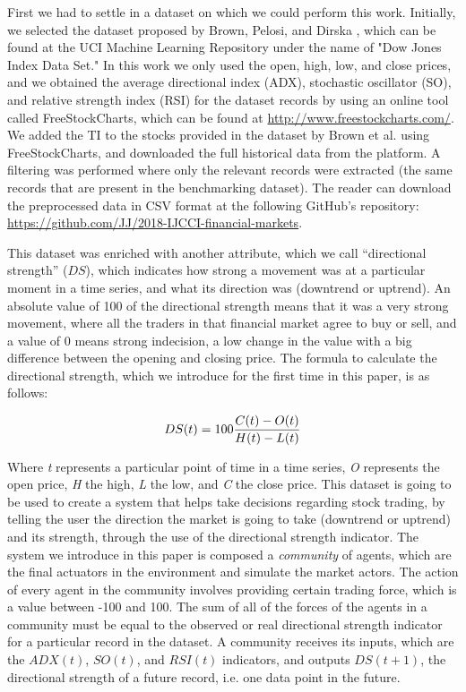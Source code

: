 \documentclass[a4paper,twoside]{article}
\begin{document}
First we had to settle in a dataset on which we could perform this
work. Initially, we selected the dataset proposed  by Brown, Pelosi, and
Dirska \cite{brown2013dynamic}, which can be found at the UCI Machine
Learning Repository under the name of "Dow Jones Index Data Set." %
In
this work we only used the open, high, low, and close prices, and we
obtained the average directional index (ADX), stochastic oscillator
(SO), and relative strength index (RSI) for the dataset records by
using an online tool called FreeStockCharts, which can be found at
\url{http://www.freestockcharts.com/}. We added the TI to the stocks
provided in the dataset by Brown et al. using FreeStockCharts, and
downloaded the full historical data from the platform. A filtering was
performed where only the relevant records were extracted (the same
records that are present in the benchmarking dataset). The reader can
download the preprocessed data in CSV format at the following GitHub's
repository: \url{https://github.com/JJ/2018-IJCCI-financial-markets}. 

This dataset was enriched with another attribute, which we call
``directional strength'' ($DS$), which indicates how strong a movement was at
a particular moment in a time series, and 
what its direction was (downtrend or uptrend). An absolute value of
100 of the directional strength means that it was a very strong
movement, where all the traders in that financial market agree to buy
or sell, and a value of 0 means strong indecision, a low change in the
value with a big difference between the opening and closing price.
The formula to calculate the directional strength, which we introduce
for the first time in this paper, is as follows: 

\begin{equation} \label{directional-strength}
  DS(t) = 100{{C(t) - O(t)} \over {H(t) - L(t)}}
\end{equation}

Where \textit{t} represents a particular point of time in a time
series, \textit{O} represents the open price, \textit{H} the high,
\textit{L} the low, and \textit{C} the close price.
This dataset is going to be used to create a system that helps take decisions
regarding stock trading, by telling the user the
direction the market is going to take (downtrend or uptrend) and
its strength, through the use of the directional strength
indicator. The system we introduce in this paper is composed a {\em
  community}  of agents,  which
are the final actuators in the environment and simulate the market
actors. The action of every agent in the community involves 
providing certain trading force, which is a value between -100 and
100. The sum of all of the forces of the agents in a community must be
equal to the observed or real directional strength indicator for a
particular record in the dataset. A community receives its inputs,
which are the $ADX(t)$, $SO(t)$, and $RSI(t)$ indicators,
and outputs  $DS(t+1)$, the directional strength of a
future record, i.e. one data point in the future. 
\end{document}
